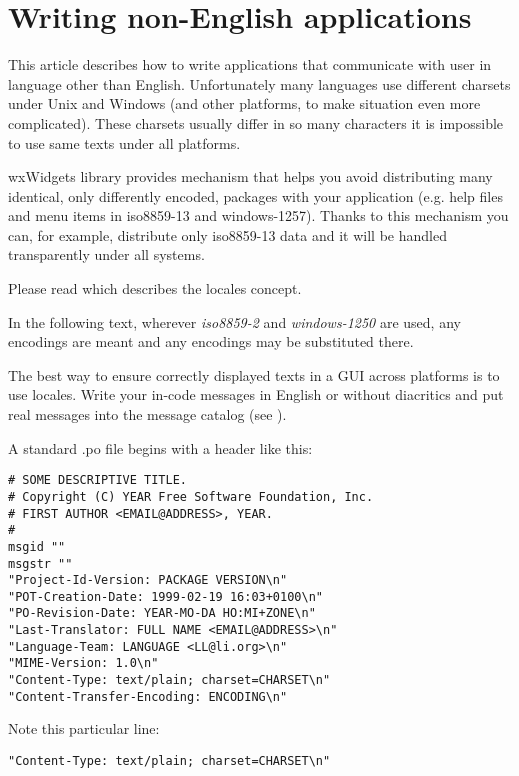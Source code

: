 \section{Writing non-English applications}\label{nonenglishoverview}

This article describes how to write applications that communicate with
user in language other than English. Unfortunately many languages use
different charsets under Unix and Windows (and other platforms, to make
situation even more complicated). These charsets usually differ in so
many characters it is impossible to use same texts under all platforms.

wxWidgets library provides mechanism that helps you avoid distributing many
identical, only differently encoded, packages with your application 
(e.g. help files and menu items in iso8859-13 and windows-1257). Thanks
to this mechanism you can, for example, distribute only iso8859-13 data 
and it will be handled transparently under all systems.

Please read  which
describes the locales concept.

In the following text, wherever {\it iso8859-2} and {\it windows-1250} are
used, any encodings are meant and any encodings may be substituted there.


The best way to ensure correctly displayed texts in a GUI across platforms
is to use locales. Write your in-code messages in English or without 
diacritics and put real messages into the message catalog (see 
).

A standard .po file begins with a header like this:

\begin{verbatim}
# SOME DESCRIPTIVE TITLE.
# Copyright (C) YEAR Free Software Foundation, Inc.
# FIRST AUTHOR <EMAIL@ADDRESS>, YEAR.
#
msgid ""
msgstr ""
"Project-Id-Version: PACKAGE VERSION\n"
"POT-Creation-Date: 1999-02-19 16:03+0100\n"
"PO-Revision-Date: YEAR-MO-DA HO:MI+ZONE\n"
"Last-Translator: FULL NAME <EMAIL@ADDRESS>\n"
"Language-Team: LANGUAGE <LL@li.org>\n"
"MIME-Version: 1.0\n"
"Content-Type: text/plain; charset=CHARSET\n"
"Content-Transfer-Encoding: ENCODING\n"
\end{verbatim}

Note this particular line:

\begin{verbatim}
"Content-Type: text/plain; charset=CHARSET\n"
\end{verbatim}

